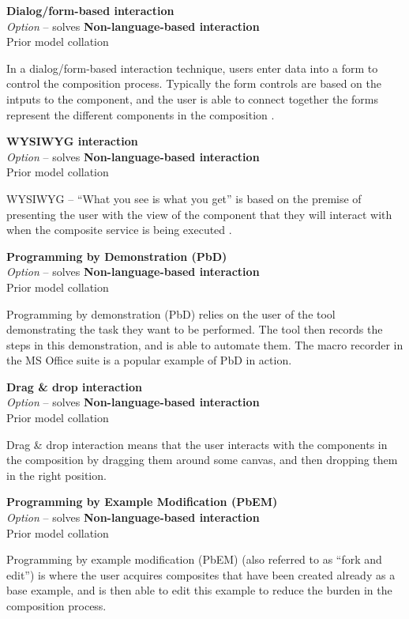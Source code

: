 \textbf{Dialog/form-based interaction} \\ \emph{Option} -- solves \textbf{Non-language-based interaction} \\ Prior model collation \cite{Aghaee2012}

In a dialog/form-based interaction technique, users enter data into a form to control the composition process. Typically the form controls are based on the intputs to the component, and the user is able to connect together the forms represent the different components in the composition \cite{Aghaee2012}.

\textbf{WYSIWYG interaction} \\ \emph{Option} -- solves \textbf{Non-language-based interaction} \\ Prior model collation \cite{Aghaee2012}

WYSIWYG -- ``What you see is what you get'' is based on the premise of presenting the user with the view of the component that they will interact with when the composite service is being executed \cite{Aghaee2012}.

\textbf{Programming by Demonstration (PbD)} \\ \emph{Option} -- solves \textbf{Non-language-based interaction} \\ Prior model collation \cite{Grammel2010,Aghaee2012,Minhas2012,Fischer2009}

Programming by demonstration (PbD) relies on the user of the tool demonstrating the task they want to be performed. The tool then records the steps in this demonstration, and is able to automate them. The macro recorder in the MS Office suite is a popular example of PbD in action.

\textbf{Drag \& drop interaction} \\ \emph{Option} -- solves \textbf{Non-language-based interaction} \\ Prior model collation \cite{Pietschmann2010}

Drag \& drop interaction means that the user interacts with the components in the composition by dragging them around some canvas, and then dropping them in the right position.

\textbf{Programming by Example Modification (PbEM)} \\ \emph{Option} -- solves \textbf{Non-language-based interaction} \\ Prior model collation \cite{Aghaee2012}

Programming by example modification (PbEM) (also referred to as ``fork and edit'') is where the user acquires composites that have been created already as a base example, and is then able to edit this example to reduce the burden in the composition process. 

